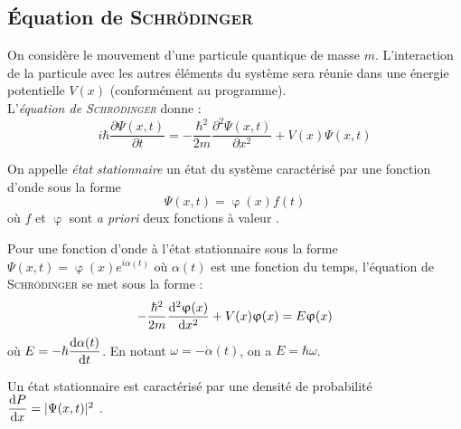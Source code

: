 \documentclass[11pt,a4paper,fleqn,pdftex]{report}
\begin{document}
\subsection{Équation de \textsc{Schrödinger}} %
\label{sub:equation_de_schrodinger}
\begin{dfn}
   On considère le mouvement  d'une particule quantique de masse $m$. L'interaction de la particule avec les autres éléments du système sera réunie dans une énergie potentielle $V(x)$  (conformément au programme). \\
   L'\emph{équation de \textsc{Schrödinger}} donne : 
   \begin{equation}\label{eq:schrodinger}
   i\hbar \dfrac{\partial \Psi (x,t)}{\partial t} = -\dfrac{\hbar^2}{2m}\dfrac{\partial^2 \Psi (x,t)}{\partial x^2} + V(x)\Psi (x,t)
   \end{equation}
\end{dfn}
\begin{dfn}%
   On appelle \emph{état stationnaire} un état du système caractérisé par une fonction d'onde  sous la forme 
   \begin{equation}
   \Psi (x,t) = \upvarphi (x) f(t)
   \end{equation}
   où $f$ et $\upvarphi$ sont \textit{a priori} deux fonctions à valeur .
\end{dfn}
\begin{itheorem}\label{thm:schrodinger_stationnaire}
Pour une fonction d'onde à l'état stationnaire sous la forme $\Psi(x,t) = \upvarphi (x) e^{i\alpha (t) }$ où $\alpha (t)$ est une fonction du temps, l'équation de \textsc{Schrödinger} se met sous la forme :
   \begin{equation}\label{eq:schrodinger_stationnaire}
   - \dfrac{\hbar^2}{2m}\dfrac{\mathrm{d}^2 \upvarphi (x)}{\mathrm{d} x^2} + V(x)\upvarphi (x) = E\upvarphi (x)
   \end{equation}
   où $E=-\hbar \dfrac{\mathrm{d} \alpha (t)}{\mathrm{d} t}$. En notant $\omega = - \dot{\alpha}(t)$, on a $E=\hbar \omega$.
\end{itheorem}
\begin{theorem}
   Un état stationnaire est caractérisé par une densité de probabilité $\dfrac{\mathrm{d} P}{\mathrm{d} x} = | \Psi (x,t) |^2$ .
\end{theorem}
\end{document}
